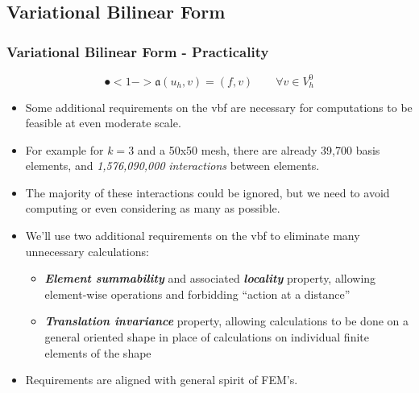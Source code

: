 \documentclass[compress]{beamer}
\begin{document}
\subsection{Variational Bilinear Form}

\begin{frame}
  \frametitle{Variational Bilinear Form - Practicality}
  $$\spot<1->{\mathfrak{a}}(u_h,v) = (f,v)\quad\quad \forall{v} \in V_h^0$$
  \begin{itemize}[<+->]
    \item Some additional requirements on the vbf are necessary for computations to be feasible at even moderate scale.
    \item For example for $k=3$ and a 50x50 mesh, there are already 39,700 basis elements, and \emph{1,576,090,000} 
      \emph{interactions} between elements. 
    \item The majority of these interactions could be ignored, but we need to avoid computing or even considering as many as possible.
    \item We'll use two additional requirements on the vbf to eliminate many unnecessary calculations:
        \begin{itemize}[<+->]
          \item \emph{\textbf{Element summability}} and associated \emph{\textbf{locality}} property, allowing element-wise operations and
            forbidding ``action at a distance''
          \item \emph{\textbf{Translation invariance}} property, allowing calculations to be done on a general oriented shape in place of
            calculations on individual finite elements of the shape
        \end{itemize}
    \item Requirements are aligned with general spirit of FEM's.
  \end{itemize}
\end{frame}
\end{document}
